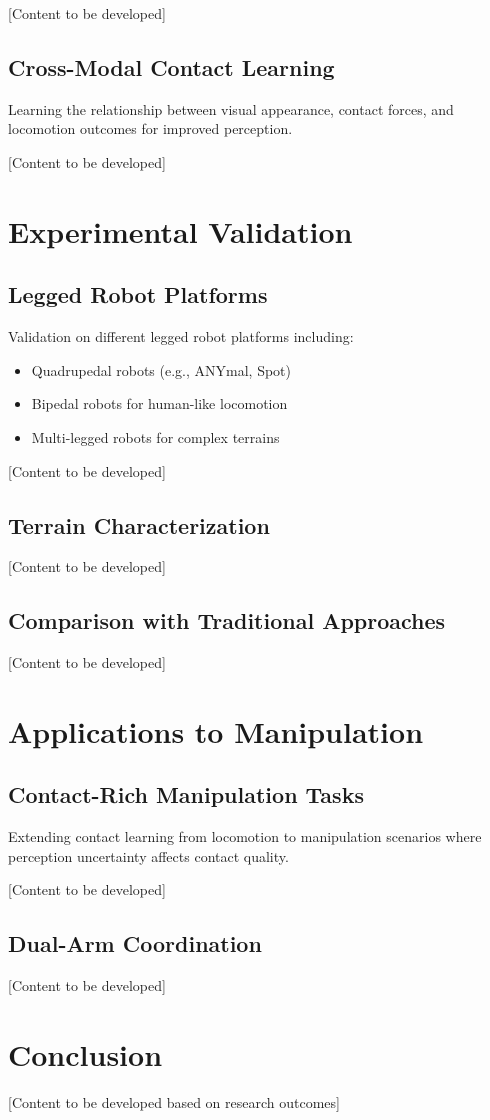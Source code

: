 [Content to be developed]

\subsection{Cross-Modal Contact Learning}

Learning the relationship between visual appearance, contact forces, and locomotion outcomes for improved perception.

[Content to be developed]

\section{Experimental Validation}

\subsection{Legged Robot Platforms}

Validation on different legged robot platforms including:
\begin{itemize}
    \item Quadrupedal robots (e.g., ANYmal, Spot)
    \item Bipedal robots for human-like locomotion
    \item Multi-legged robots for complex terrains
\end{itemize}

[Content to be developed]

\subsection{Terrain Characterization}

[Content to be developed]

\subsection{Comparison with Traditional Approaches}

[Content to be developed]

\section{Applications to Manipulation}

\subsection{Contact-Rich Manipulation Tasks}

Extending contact learning from locomotion to manipulation scenarios where perception uncertainty affects contact quality.

[Content to be developed]

\subsection{Dual-Arm Coordination}

[Content to be developed]

\section{Conclusion}

[Content to be developed based on research outcomes]